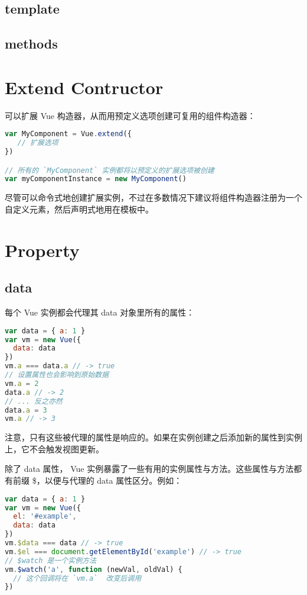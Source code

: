 \subsection{template}


\subsection{methods}




\section{Extend Contructor}


可以扩展 Vue 构造器，从而用预定义选项创建可复用的组件构造器：


\begin{lstlisting}[language=JavaScript]
var MyComponent = Vue.extend({
   // 扩展选项
})

// 所有的 `MyComponent` 实例都将以预定义的扩展选项被创建
var myComponentInstance = new MyComponent()
\end{lstlisting}


尽管可以命令式地创建扩展实例，不过在多数情况下建议将组件构造器注册为一个自定义元素，然后声明式地用在模板中。

\section{Property}

\subsection{data}

每个 Vue 实例都会代理其 data 对象里所有的属性：

\begin{lstlisting}[language=JavaScript]
var data = { a: 1 }
var vm = new Vue({
  data: data
})
vm.a === data.a // -> true
// 设置属性也会影响到原始数据
vm.a = 2
data.a // -> 2
// ... 反之亦然
data.a = 3
vm.a // -> 3
\end{lstlisting}

注意，只有这些被代理的属性是响应的。如果在实例创建之后添加新的属性到实例上，它不会触发视图更新。

除了 data 属性， Vue 实例暴露了一些有用的实例属性与方法。这些属性与方法都有前缀 \$，以便与代理的 data 属性区分。例如：

\begin{lstlisting}[language=JavaScript]
var data = { a: 1 }
var vm = new Vue({
  el: '#example',
  data: data
})
vm.$data === data // -> true
vm.$el === document.getElementById('example') // -> true
// $watch 是一个实例方法
vm.$watch('a', function (newVal, oldVal) {
  // 这个回调将在 `vm.a`  改变后调用
})
\end{lstlisting}

